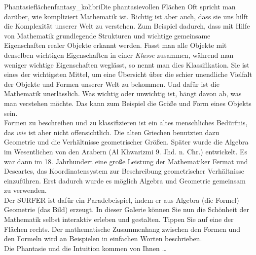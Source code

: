 \begin{surferIntroPage}{Phantasieflächen}{fantasy_kolibri}{Die phantasievollen Flächen}
Oft spricht man darüber, wie kompliziert Mathematik ist. Richtig ist aber auch, dass sie uns hilft die Komplexität unserer Welt zu verstehen. Zum Beispiel dadurch, dass mit Hilfe von Mathematik grundlegende Strukturen und wichtige gemeinsame Eigenschaften realer Objekte erkannt werden. Fasst man alle Objekte mit denselben wichtigen Eigenschaften in einer \textit{Klasse} zusammen, während man weniger wichtige Eigenschaften weglässt, so nennt man dies Klassifikation. Sie ist eines der wichtigsten Mittel, um eine \"Ubersicht über die schier unendliche Vielfalt der Objekte und Formen unserer Welt zu bekommen. Und dafür ist die Mathematik unerlässlich. Was wichtig oder unwichtig ist, hängt davon ab, was man verstehen m\"ochte. Das kann zum Beispiel die Gr\"o\ss e und Form eines Objekts sein.
\\
Formen zu beschreiben und zu klassifizieren ist ein altes menschliches Bed\"urfnis, das  \textit{wie} ist aber nicht offensichtlich. Die alten Griechen benutzten dazu Geometrie und die Verhältnisse geometrischer Gr\"o\ss en. Später wurde die Algebra im Wesentlichen von den Arabern (Al Khwarizmi 9. Jhd. n. Chr.) entwickelt. Es war dann im 18. Jahrhundert eine gro\ss e Leistung der Mathematiker Fermat und Descartes, das Koordinatensystem zur Beschreibung geometrischer Verhältnisse einzuführen. Erst dadurch wurde es m\"oglich Algebra und Geometrie gemeinsam zu verwenden. 
\\

Der SURFER ist dafür ein Paradebeispiel, indem er aus Algebra (die Formel) Geometrie (das Bild) erzeugt. 
In dieser Galerie können Sie nun die Schönheit der Mathematik selbst interaktiv erleben und gestalten. Tippen Sie auf eine der Fl\"achen rechts. Der mathematische Zusammenhang zwischen den Formen und den Formeln wird an Beispielen in einfachen Worten beschrieben. \\ Die Phantasie und die Intuition kommen von Ihnen \dots
\end{surferIntroPage}
